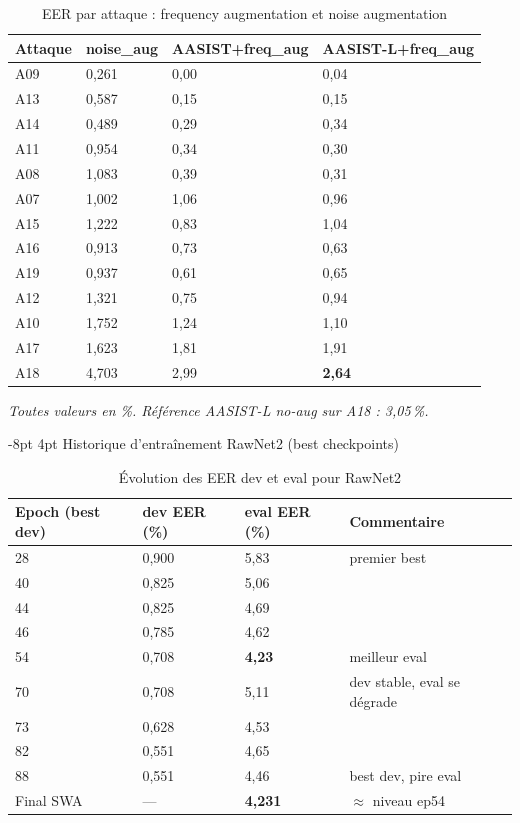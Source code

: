 \documentclass[10pt, a4paper]{article}
\makeatletter
\renewcommand{\section}{\@startsection{section}{1}{\z@}%
  {-8pt \@plus -2pt \@minus -2pt}{4pt \@plus 1pt}%
  {\normalfont\Large\bfseries}}
\makeatother
\begin{document}
\begin{table}[H]
\centering\footnotesize
\caption{EER par attaque : frequency augmentation et noise augmentation}
\begin{tabular}{@{}llll@{}}
\toprule
Attaque & noise\_aug & AASIST+freq\_aug & AASIST-L+freq\_aug \\
\midrule
A09 & 0,261 & 0,00 & 0,04 \\
A13 & 0,587 & 0,15 & 0,15 \\
A14 & 0,489 & 0,29 & 0,34 \\
A11 & 0,954 & 0,34 & 0,30 \\
A08 & 1,083 & 0,39 & 0,31 \\
A07 & 1,002 & 1,06 & 0,96 \\
A15 & 1,222 & 0,83 & 1,04 \\
A16 & 0,913 & 0,73 & 0,63 \\
A19 & 0,937 & 0,61 & 0,65 \\
A12 & 1,321 & 0,75 & 0,94 \\
A10 & 1,752 & 1,24 & 1,10 \\
A17 & 1,623 & 1,81 & 1,91 \\
A18 & 4,703 & 2,99 & \textbf{2,64} \\
\bottomrule
\end{tabular}
\smallskip

\noindent\textit{Toutes valeurs en \%. Référence AASIST-L no-aug sur A18 : 3,05\,\%.}
\end{table}

\section{Historique d'entraînement RawNet2 (best checkpoints)}

\begin{table}[H]
\centering\small
\caption{Évolution des EER dev et eval pour RawNet2}
\begin{tabular}{@{}llll@{}}
\toprule
Epoch (best dev) & dev EER (\%) & eval EER (\%) & Commentaire \\
\midrule
28  & 0,900 & 5,83 & premier best \\
40  & 0,825 & 5,06 & \\
44  & 0,825 & 4,69 & \\
46  & 0,785 & 4,62 & \\
54  & 0,708 & \textbf{4,23} & meilleur eval \\
70  & 0,708 & 5,11 & dev stable, eval se dégrade \\
73  & 0,628 & 4,53 & \\
82  & 0,551 & 4,65 & \\
88  & 0,551 & 4,46 & best dev, pire eval \\
Final SWA & --- & \textbf{4,231} & $\approx$ niveau ep54 \\
\bottomrule
\end{tabular}
\end{table}
\end{document}
